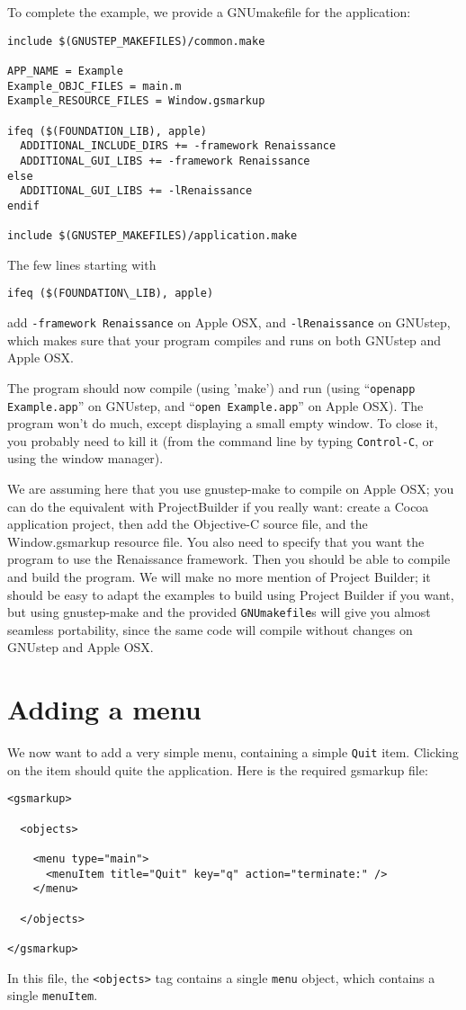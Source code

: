 \documentclass[a4paper]{article}
\begin{document}
To complete the example, we provide a GNUmakefile for the application:
\begin{verbatim}
include $(GNUSTEP_MAKEFILES)/common.make

APP_NAME = Example
Example_OBJC_FILES = main.m
Example_RESOURCE_FILES = Window.gsmarkup

ifeq ($(FOUNDATION_LIB), apple)
  ADDITIONAL_INCLUDE_DIRS += -framework Renaissance
  ADDITIONAL_GUI_LIBS += -framework Renaissance
else
  ADDITIONAL_GUI_LIBS += -lRenaissance
endif

include $(GNUSTEP_MAKEFILES)/application.make
\end{verbatim}
The few lines starting with 
\begin{verbatim}
ifeq ($(FOUNDATION\_LIB), apple)
\end{verbatim}
add \texttt{-framework Renaissance} on Apple OSX, and
\texttt{-lRenaissance} on GNUstep, which makes sure that your program
compiles and runs on both GNUstep and Apple OSX.

The program should now compile (using 'make') and run (using
``\texttt{openapp Example.app}'' on GNUstep, and ``\texttt{open
Example.app}'' on Apple OSX).  The program won't do much, except
displaying a small empty window.  To close it, you probably need to
kill it (from the command line by typing \texttt{Control-C}, or using
the window manager).

We are assuming here that you use gnustep-make to compile on Apple
OSX; you can do the equivalent with ProjectBuilder if you really want:
create a Cocoa application project, then add the Objective-C source
file, and the Window.gsmarkup resource file.  You also need to specify
that you want the program to use the Renaissance framework.  Then you
should be able to compile and build the program.  We will make no more
mention of Project Builder; it should be easy to adapt the examples to
build using Project Builder if you want, but using gnustep-make and
the provided \texttt{GNUmakefile}s will give you almost seamless
portability, since the same code will compile without changes on
GNUstep and Apple OSX.

\section{Adding a menu}
We now want to add a very simple menu, containing a simple
\texttt{Quit} item.  Clicking on the item should quite the application.
Here is the required gsmarkup file:
\begin{verbatim}
<gsmarkup>

  <objects>

    <menu type="main">
      <menuItem title="Quit" key="q" action="terminate:" />
    </menu>
 
  </objects>

</gsmarkup>
\end{verbatim}
In this file, the \texttt{<objects>} tag contains a single
\texttt{menu} object, which contains a single \texttt{menuItem}.
\end{document}
